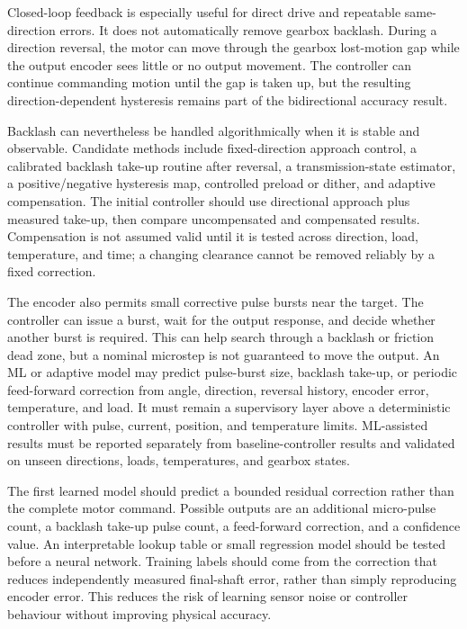 \documentclass[11pt,a4paper]{article}
\begin{document}
Closed-loop feedback is especially useful for direct drive and repeatable same-direction errors. It does not automatically remove gearbox backlash. During a direction reversal, the motor can move through the gearbox lost-motion gap while the output encoder sees little or no output movement. The controller can continue commanding motion until the gap is taken up, but the resulting direction-dependent hysteresis remains part of the bidirectional accuracy result.

Backlash can nevertheless be handled algorithmically when it is stable and observable. Candidate methods include fixed-direction approach control, a calibrated backlash take-up routine after reversal, a transmission-state estimator, a positive/negative hysteresis map, controlled preload or dither, and adaptive compensation. The initial controller should use directional approach plus measured take-up, then compare uncompensated and compensated results. Compensation is not assumed valid until it is tested across direction, load, temperature, and time; a changing clearance cannot be removed reliably by a fixed correction.

The encoder also permits small corrective pulse bursts near the target. The controller can issue a burst, wait for the output response, and decide whether another burst is required. This can help search through a backlash or friction dead zone, but a nominal microstep is not guaranteed to move the output. An ML or adaptive model may predict pulse-burst size, backlash take-up, or periodic feed-forward correction from angle, direction, reversal history, encoder error, temperature, and load. It must remain a supervisory layer above a deterministic controller with pulse, current, position, and temperature limits. ML-assisted results must be reported separately from baseline-controller results and validated on unseen directions, loads, temperatures, and gearbox states.

The first learned model should predict a bounded residual correction rather than the complete motor command. Possible outputs are an additional micro-pulse count, a backlash take-up pulse count, a feed-forward correction, and a confidence value. An interpretable lookup table or small regression model should be tested before a neural network. Training labels should come from the correction that reduces independently measured final-shaft error, rather than simply reproducing encoder error. This reduces the risk of learning sensor noise or controller behaviour without improving physical accuracy.
\end{document}

